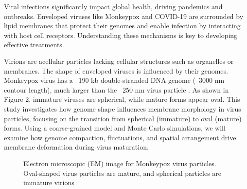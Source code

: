 \documentclass[12pt]{article}
\begin{document}
\begin{flushleft}

Viral infections significantly impact global health, driving pandemics and outbreaks. Enveloped viruses like Monkeypox and COVID-19 are surrounded by lipid membranes that protect their genomes and enable infection by interacting with host cell receptors. Understanding these mechanisms is key to developing effective treatments.

Virions are acellular particles lacking cellular structures such as organelles or membranes.
The shape of enveloped viruses is influenced by their genomes. Monkeypox virus has a ~190 kb double-stranded DNA genome (~3000 nm contour length), much larger than the ~250 nm virus particle \cite{erez2019diagnosis}\cite{parker2007human}. As shown in Figure 2, immature viruses are spherical, while mature forms appear oval.
This study investigates how genome shape influences membrane morphology in virus particles, focusing on the transition from spherical (immature) to oval (mature) forms. Using a coarse-grained model and Monte Carlo simulations, we will examine how genome compaction, fluctuations, and spatial arrangement drive membrane deformation during virus maturation.




\begin{figure}[!ht]
  \centering  
  \caption{Electron microscopic (EM) image for
Monkeypox virus particles. Oval-shaped
virus particles are mature, and spherical
particles are immature virions \cite{goldsmith2003monkeypox}}
\end{figure}

\end{flushleft}
\end{document}
